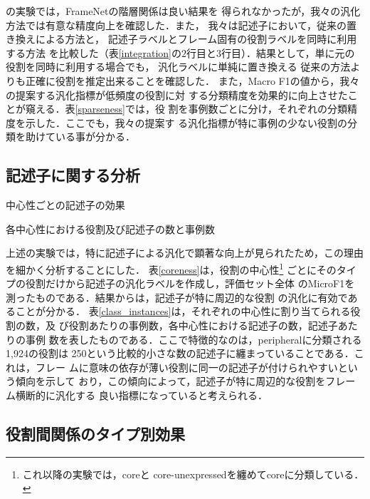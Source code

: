 \documentclass[japanese]{jnlp_1.4}
\begin{document}
の実験では，FrameNetの階層関係は良い結果を
得られなかったが，我々の汎化方法では有意な精度向上を確認した．また，
我々は記述子において，従来の置き換えによる方法と，
記述子ラベルとフレーム固有の役割ラベルを同時に利用する方法
を比較した（表\ref{integration}の$2$行目と$3$行目）．結果として，単に元の
役割を同時に利用する場合でも，
汎化ラベルに単純に置き換える
従来の方法よりも正確に役割を推定出来ることを確認した．
また，Macro F1の値から，我々の提案する汎化指標が低頻度の役割に対
する分類精度を効果的に向上させたことが窺える．表\ref{sparseness}では，役
割を事例数ごとに分け，それぞれの分類精度を示した．ここでも，我々の提案す
る汎化指標が特に事例の少ない役割の分類を助けている事が分かる．


\subsection{記述子に関する分析}

\begin{table}[t]
\begin{minipage}[t]{145pt}
\caption{中心性ごとの記述子の効果}
\label{coreness} 

\end{minipage}
\hfill
\begin{minipage}[t]{270pt}
\caption{各中心性における役割及び記述子の数と事例数}
\label{class_instances} 

\end{minipage}
\end{table}

上述の実験では，特に記述子による汎化で顕著な向上が見られたため，この理由
を細かく分析することにした．
表\ref{coreness}は，役割の中心性\footnote{これ以降の実験では，coreと
core-unexpressedを纏めてcoreに分類している．}
ごとにそのタイプの役割だけから記述子の汎化ラベルを作成し，評価セット全体
のMicroF1を測ったものである．結果からは，記述子が特に周辺的な役割
の汎化に有効であることが分かる．
表\ref{class_instances}は，それぞれの中心性に割り当てられる役割の数，及
び役割あたりの事例数，各中心性における記述子の数，記述子あたりの事例
数を表したものである．ここで特徴的なのは，peripheralに分類される1,924の役割は
250という比較的小さな数の記述子に纏まっていることである．これは，フレー
ムに意味の依存が薄い役割に同一の記述子が付けられやすいという傾向を示して
おり，この傾向によって，記述子が特に周辺的な役割をフレーム横断的に汎化する
良い指標になっていると考えられる．


\subsection{役割間関係のタイプ別効果}
\label{sec:compare-hierarchical-relation}
\end{document}
